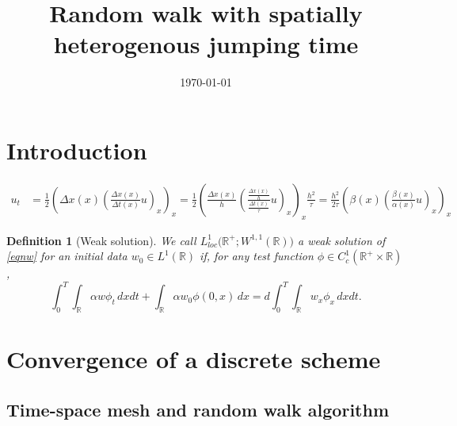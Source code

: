 \documentclass[a4paper,11pt]{article}
\def\t{{\tau}}
\def\l{{h}}
\def\R{\mathbb{R}}
\newtheorem{definition}{Definition}[section]
\theoremstyle{remark}
\begin{document}
\title{Random walk with spatially heterogenous jumping time}
\date{\today}

\maketitle

\section{Introduction}
\begin{align*}
 u_t &= \frac{1}{2} \left( \Delta x(x) \left( \frac{\Delta x(x)}{\Delta t(x)} u \right)_x\right)_x= \frac{1}{2} \left( \tfrac{\Delta x(x)}{\l} \left( \frac{\tfrac{\Delta x(x)}{\l}}{\tfrac{\Delta t(x)}{\tau}} u \right)_x\right)_x \frac{\l^2}{\t} =  \frac{\l^2}{2\t} \left( \beta(x) \left( \frac{\beta(x)}{\alpha(x)} u \right)_x\right)_x
\end{align*}

\begin{definition}[Weak solution] We call $L^1_{loc}\big(\R^+;W^{1,1}(\R)\big)$ a weak solution of
\eqref{eqnw} for an initial data $w_0 \in L^1(\R)$ if, for any test function $\phi \in
C_c^1(\R^+\times \R)$,
 \begin{equation}\label{DefWeak}
  \int_0^T\int_\R \alpha w\phi_t\,dxdt
  +\int_\R\alpha w_0\phi(0,x)\,dx = d\int_0^T\int_\R w_x\phi_x\, dxdt.
 \end{equation}
\end{definition}


\section{Convergence of a discrete scheme}

\subsection{Time-space mesh and random walk algorithm}
\end{document}
